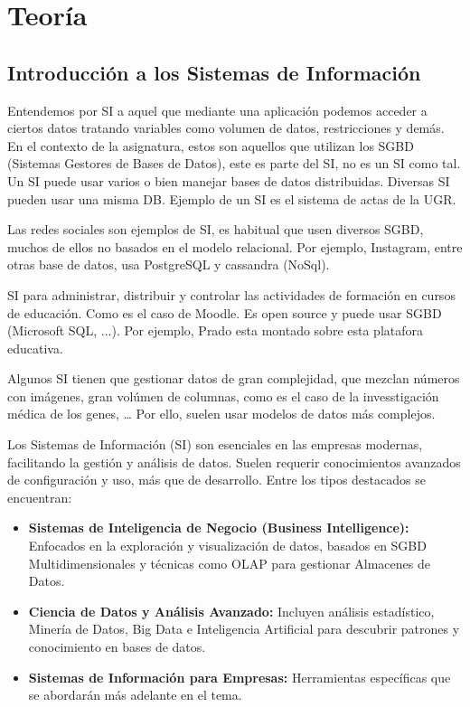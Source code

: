 \documentclass[12pt]{report} %
\providecommand{\tightlist}{%
  \setlength{\itemsep}{0pt}\setlength{\parskip}{0pt}}
\begin{document}
\part{Teoría}

\hypertarget{introducciuxf3n-a-los-sistemas-de-informaciuxf3n}{%
\chapter{Introducción a los Sistemas de
Información}\label{introducciuxf3n-a-los-sistemas-de-informaciuxf3n}}

\begin{definicion}
Entendemos por SI a aquel que mediante una aplicación podemos acceder a ciertos datos tratando variables como volumen de datos, restricciones y demás. En el contexto de la asignatura, estos son aquellos que utilizan los SGBD (Sistemas Gestores de Bases de Datos), este es parte del SI, no es un SI como tal. Un SI puede usar varios o bien manejar bases de datos distribuidas. Diversas SI pueden usar una misma DB. Ejemplo de un SI es el sistema de actas de la UGR.
\end{definicion}

Las redes sociales son ejemplos de SI, es habitual que usen diversos
SGBD, muchos de ellos no basados en el modelo relacional. Por ejemplo,
Instagram, entre otras base de datos, usa PostgreSQL y cassandra
(NoSql).

\begin{definicion}
SI para administrar, distribuir y controlar las actividades de formación en cursos de educación. Como es el caso de Moodle. Es open source y puede usar SGBD (Microsoft SQL, ...). Por ejemplo, Prado esta montado sobre esta platafora educativa.
\end{definicion}

Algunos SI tienen que gestionar datos de gran complejidad, que mezclan
números con imágenes, gran volúmen de columnas, como es el caso de la
invesstigación médica de los genes, \ldots{} Por ello, suelen usar
modelos de datos más complejos.

Los Sistemas de Información (SI) son esenciales en las empresas
modernas, facilitando la gestión y análisis de datos. Suelen requerir
conocimientos avanzados de configuración y uso, más que de desarrollo.
Entre los tipos destacados se encuentran:

\begin{itemize}
\tightlist
\item
  \textbf{Sistemas de Inteligencia de Negocio (Business Intelligence):}
  Enfocados en la exploración y visualización de datos, basados en SGBD
  Multidimensionales y técnicas como OLAP para gestionar Almacenes de
  Datos.
\item
  \textbf{Ciencia de Datos y Análisis Avanzado:} Incluyen análisis
  estadístico, Minería de Datos, Big Data e Inteligencia Artificial para
  descubrir patrones y conocimiento en bases de datos.
\item
  \textbf{Sistemas de Información para Empresas:} Herramientas
  específicas que se abordarán más adelante en el tema.
\end{itemize}
\end{document}
